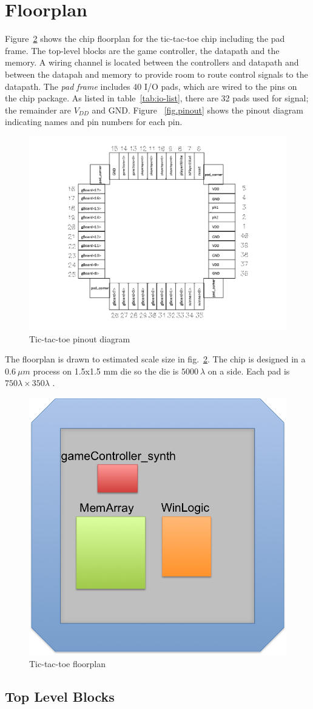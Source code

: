 \documentclass[]{article}
\begin{document}
\section{Floorplan}
\label{sec:floorplan}
Figure~\ref{fig:floorplan} shows the chip floorplan for  the tic-tac-toe chip including the pad frame. The top-level blocks are the game controller, the datapath and the memory. A wiring channel is located between the controllers and datapath and between the datapah and memory to provide room to route control signals to the datapath. The \emph{pad frame} includes 40 I/O pads, which are wired to the pins on the chip package. As listed in table~\ref{tab:io-list}, there are 32 pads used for signal; the remainder are $V_{DD}$ and GND. Figure ~\ref{fig.pinout} shows the pinout diagram indicating names and pin numbers for each pin.

\begin{figure}
\centering
\includegraphics[width=.2\textwidth]{pinout}
\caption{Tic-tac-toe pinout diagram}
\label{fig:pinout}
\end{figure}

The floorplan is drawn to estimated scale size in fig.~\ref{fig:floorplan}. The chip is designed in a $0.6~\mu m$ process on 1.5x1.5 mm die so the die is $5000~\lambda$
on a side. Each pad is $750 \lambda \times 350 \lambda$
\cite{e85-book}.


\begin{figure}
\centering
\includegraphics[width=.2\textwidth]{chipsize}
\caption{Tic-tac-toe floorplan}
\label{fig:floorplan}
\end{figure}

\subsection{Top Level Blocks}
\end{document}
